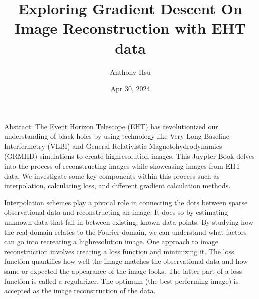 \documentclass[letterpaper,10pt,english]{jupyterBook}
\title{Exploring Gradient Descent On Image Reconstruction with EHT data}
\date{Apr 30, 2024}
\author{Anthony Hsu}
\begin{document}
\pagestyle{empty}
\sphinxmaketitle
\pagestyle{plain}
\sphinxtableofcontents
\pagestyle{normal}
\label{\detokenize{intro::doc}}


\begin{DUlineblock}{0em}
\item[] 
\end{DUlineblock}

\sphinxAtStartPar
Abstract:
The Event Horizon Telescope (EHT) has revolutionized our understanding of black holes by using technology like Very Long Baseline Interfermetry (VLBI) and General Relativistic Magnetohydrodynamics (GRMHD) simulations to create high\sphinxhyphen{}resolution images.
This Juypter Book delves into the process of reconstructing images while showcasing images from EHT data. We investigate some key components within this process such as interpolation, calculating loss, and different gradient calculation methods.

\sphinxAtStartPar
Interpolation schemes play a pivotal role in connecting the dots between sparse observational data and reconstructing an image. It does so by estimating unknown data that fall in between existing, known data points. By studying how the real domain relates to the Fourier domain, we can understand what factors can go into recreating a high\sphinxhyphen{}resolution image. One approach to image reconstruction involves creating a loss function and minimizing it. The loss function quantifies how well the image matches the observational data and how same or expected the appearance of the image looks. The latter part of a loss function is called a regularizer. The optimum (the best performing image) is accepted as the image reconstruction of the data.
\end{document}
